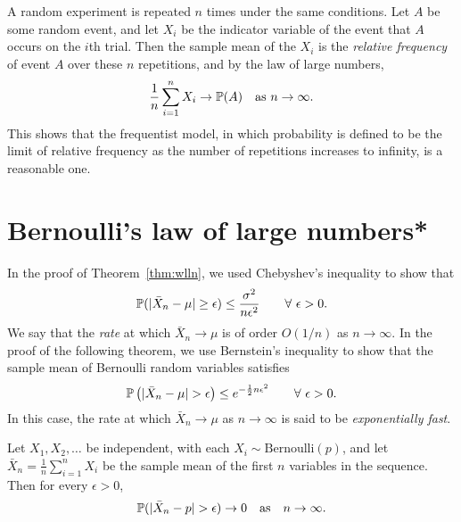 \begin{remark}
A random experiment is repeated $n$ times under the same conditions. Let $A$ be some random event, and let $X_i$ be the indicator variable of the event that $A$ occurs on the $i$th trial. Then the sample mean of the $X_i$ is the \emph{relative frequency} of event $A$ over these $n$ repetitions, and by the law of large numbers,
\[
\frac{1}{n}\sum_{i=1}^n X_i \to \mathbb{P}(A) \quad\text{as $n\to\infty$.}
\]
This shows that the frequentist model, in which probability is defined to be the limit of relative frequency as the number of repetitions increases to infinity, is a reasonable one.
\end{remark}

\section{Bernoulli's law of large numbers*}
In the proof of Theorem~\ref{thm:wlln}, we used Chebyshev's inequality to show that%
\[
\prob(|\bar{X}_n - \mu| \geq \epsilon) \leq \frac{\sigma^2}{n\epsilon^2} \qquad\forall\ \epsilon>0.
\]
We say that the \emph{rate} at which $\bar{X}_n\to\mu$ is of order $O(1/n)$ as $n\to\infty$.
%
In the proof of the following theorem, we use Bernstein's inequality to show that the sample mean of Bernoulli random variables satisfies
\[
\mathbb{P}\left(|\bar{X}_n - \mu| > \epsilon\right) \leq e^{-\frac{1}{2}n\epsilon^2}  \qquad\forall\ \epsilon>0.
\]
In this case, the rate at which $\bar{X}_n\to\mu$ as $n\to\infty$ is said to be \emph{exponentially fast}. 

\begin{theorem}\label{thm:bernoulli_lln}
Let $X_1,X_2,\ldots$ be independent, with each $X_i\sim\text{Bernoulli}(p)$, and let $\bar{X}_n = \frac{1}{n}\sum_{i=1}^n X_i$ be the sample mean of the first $n$ variables in the sequence.
Then for every $\epsilon > 0$, 
\[
\mathbb{P}(|\bar{X}_n - p| > \epsilon) \to 0 \text{\quad as\quad} n\to\infty.
\]
\end{theorem}


